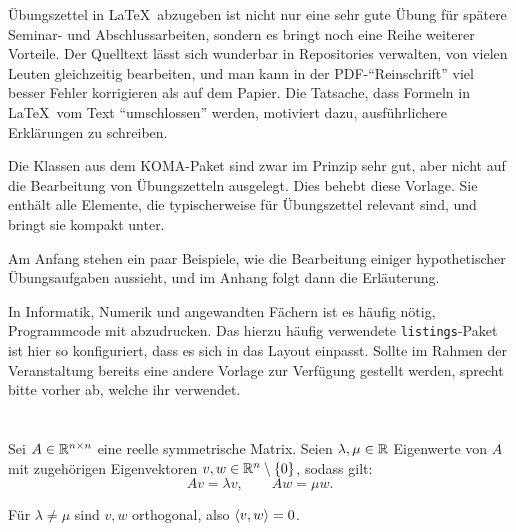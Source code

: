 \documentclass[parskip=half-,DIV14,10pt]{scrartcl}
\begin{document}
\asnmenttitle %

Übungszettel in \LaTeX\ abzugeben ist nicht nur eine sehr gute Übung
für spätere Seminar- und Abschlussarbeiten, sondern es bringt noch
eine Reihe weiterer Vorteile.  Der Quelltext lässt sich wunderbar in
Repositories verwalten, von vielen Leuten gleichzeitig bearbeiten, und
man kann in der PDF-"`Reinschrift"' viel besser Fehler korrigieren als
auf dem Papier.  Die Tatsache, dass Formeln in \LaTeX\ vom Text
"`umschlossen"' werden, motiviert dazu, ausführlichere Erklärungen zu
schreiben.

Die Klassen aus dem KOMA-Paket sind zwar im Prinzip sehr gut,
aber nicht auf die Bearbeitung von Übungszetteln ausgelegt.
Dies behebt diese Vorlage.  Sie enthält alle Elemente, die
typischerweise für Übungszettel relevant sind, und bringt sie kompakt
unter.

Am Anfang stehen ein paar Beispiele, wie die Bearbeitung einiger
hypothetischer Übungsaufgaben aussieht, und im Anhang folgt dann die
Erläuterung.

In Informatik, Numerik und angewandten Fächern ist es häufig nötig,
Programmcode mit abzudrucken.  Das hierzu häufig verwendete
\lstinline!listings!-Paket ist hier so konfiguriert, dass es sich in
das Layout einpasst.  Sollte im Rahmen der Veranstaltung bereits eine
andere Vorlage zur Verfügung gestellt werden, sprecht bitte vorher ab,
welche ihr verwendet.

\section{}
\subsection{}
\subsubsection{}

\begin{given}
Sei $A\in\mathbb{R}^{n\times n}$ eine reelle symmetrische Matrix.  Seien
$\lambda,\mu\in\mathbb{R}$ Eigenwerte von $A$ mit zugehörigen Eigenvektoren 
$v,w\in\mathbb{R}^n\setminus\{0\}$, sodass gilt:
\[ Av=\lambda v,\qquad Aw=\mu w. \]
\end{given}

\begin{toshow}
Für $\lambda\neq\mu$ sind $v,w$ orthogonal, also $\left\langle v,w\right\rangle=0$.
\end{toshow}
\end{document}
